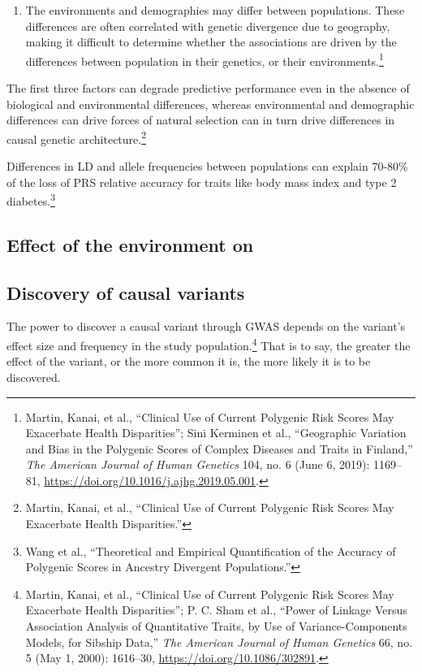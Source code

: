 \documentclass[
  9pt,
]{book}
\begin{document}
\begin{enumerate}
\item
  The environments and demographies may differ between populations. These differences are often correlated with genetic divergence due to geography, making it difficult to determine whether the associations are driven by the differences between population in their genetics, or their environments.\footnote{Martin, Kanai, et al., {``Clinical Use of Current Polygenic Risk Scores May Exacerbate Health Disparities''}; Sini Kerminen et al., {``Geographic {Variation} and {Bias} in the {Polygenic Scores} of {Complex Diseases} and {Traits} in {Finland},''} \emph{The American Journal of Human Genetics} 104, no. 6 (June 6, 2019): 1169--81, \url{https://doi.org/10.1016/j.ajhg.2019.05.001}.}
\end{enumerate}

The first three factors can degrade predictive performance even in the absence of biological and environmental differences, whereas environmental and demographic differences can drive forces of natural selection can in turn drive differences in causal genetic architecture.\footnote{Martin, Kanai, et al., {``Clinical Use of Current Polygenic Risk Scores May Exacerbate Health Disparities.''}}

Differences in LD and allele frequencies between populations can explain 70-80\% of the loss of PRS relative accuracy for traits like body mass index and type 2 diabetes.\footnote{Wang et al., {``Theoretical and Empirical Quantification of the Accuracy of Polygenic Scores in Ancestry Divergent Populations.''}}

\hypertarget{effect-of-the-environment-on}{%
\subsection{Effect of the environment on}\label{effect-of-the-environment-on}}

\hypertarget{discovery-of-causal-variants}{%
\subsection{Discovery of causal variants}\label{discovery-of-causal-variants}}

The power to discover a causal variant through GWAS depends on the variant's effect size and frequency in the study population.\footnote{Martin, Kanai, et al., {``Clinical Use of Current Polygenic Risk Scores May Exacerbate Health Disparities''}; P. C. Sham et al., {``Power of {Linkage} Versus {Association Analysis} of {Quantitative Traits}, by {Use} of {Variance-Components Models}, for {Sibship Data},''} \emph{The American Journal of Human Genetics} 66, no. 5 (May 1, 2000): 1616--30, \url{https://doi.org/10.1086/302891}.} That is to say, the greater the effect of the variant, or the more common it is, the more likely it is to be discovered.
\end{document}
